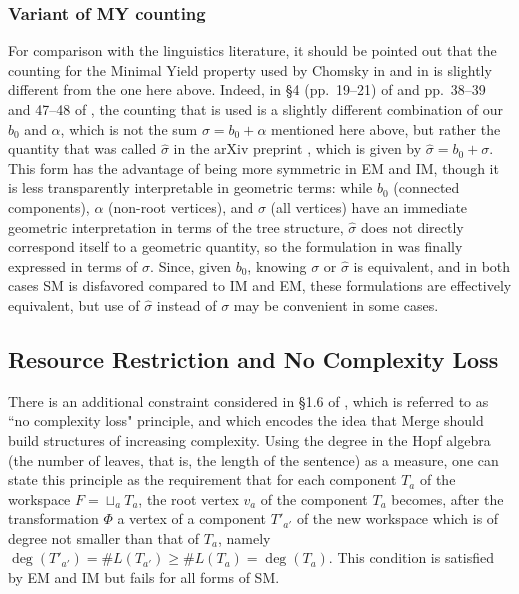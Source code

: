 \documentclass[12pt]{amsart}
\numberwithin{equation}{section}
\begin{document}
\smallskip
\subsubsection{Variant of MY counting}

For comparison with the linguistics literature, it should be pointed
out that the counting for the Minimal Yield property used by
Chomsky in \cite{ChomskyGK} and in \cite{ChomskyUCLA} is
slightly different from the one here above. Indeed, in \S 4 (pp.~19--21)
of \cite{ChomskyGK} and pp.~38--39 and 47--48 of \cite{ChomskyUCLA},
the counting that is used is a slightly different combination of our
$b_0$ and $\alpha$, which is not the sum $\sigma=b_0+\alpha$ mentioned
here above, but rather the quantity that was called $\hat\sigma$ in the arXiv 
preprint \cite{MCB1}, which is given by $\hat\sigma= b_0 + \sigma$. This
form has the advantage of being more symmetric in EM and IM,
though it is less transparently interpretable in geometric terms:
while $b_0$ (connected components), $\alpha$ (non-root vertices), and
$\sigma$ (all vertices) have an immediate geometric interpretation
in terms of the tree structure, $\hat\sigma$ does not directly correspond
itself to a geometric quantity, so the formulation in \cite{MCB} was
finally expressed in terms of $\sigma$.  Since, given $b_0$, knowing
$\sigma$ or $\hat\sigma$ is equivalent, and in both cases SM is
disfavored compared to IM and EM, these formulations are
effectively equivalent, but use of $\hat\sigma$ instead of
$\sigma$ may be convenient in some cases. 



\smallskip
\subsection{Resource Restriction and No Complexity Loss} \label{NCLsec}

There is an additional constraint considered in \S 1.6 of \cite{MCB},
which is referred to as ``no complexity loss" principle, and which
encodes the idea that Merge should build structures of increasing
complexity. Using the degree in the Hopf algebra (the number of
leaves, that is, the length of the sentence) as a measure, one
can state this principle as the requirement that for each component
$T_a$ of the workspace $F=\sqcup_a T_a$, the root vertex $v_a$
of the component $T_a$ becomes, after the transformation $\Phi$
a vertex of a component $T'_{a'}$ of the new workspace which
is of degree not smaller than that of $T_a$, namely
$\deg(T'_{a'})=\# L(T_{a'})\geq \#L(T_a)=\deg(T_a)$. This condition
is satisfied by EM and IM but fails for all forms of SM.
\end{document}
